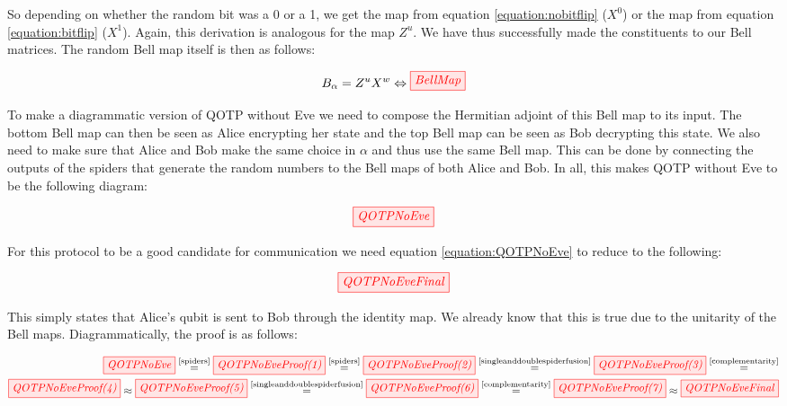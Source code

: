 \documentclass[]{article}
\newcommand{\equaltext}[1]{\ensuremath{\stackrel{\text{#1}}{=}}}
\begin{document}
So depending on whether the random bit was a 0 or a 1, we get the map from equation \ref{equation:nobitflip} ($X^0$) or the map from equation \ref{equation:bitflip} ($X^1$). Again, this derivation is analogous for the map $Z^u$. We have thus successfully made the constituents to our Bell matrices. The random Bell map itself is then as follows:

\begin{equation}
	\label{equation:BellMap}
	B_\alpha = Z^uX^w \Leftrightarrow \tikzfig{BellMap}
\end{equation}

To make a diagrammatic version of QOTP without Eve we need to compose the Hermitian adjoint of this Bell map to its input. The bottom Bell map can then be seen as Alice encrypting her state and the top Bell map can be seen as Bob decrypting this state. We also need to make sure that Alice and Bob make the same choice in $\alpha$ and thus use the same Bell map. This can be done by connecting the outputs of the spiders that generate the random numbers to the Bell maps of both Alice and Bob. In all, this makes QOTP without Eve to be the following diagram:

\begin{equation}
	\tikzfig{QOTPNoEve}
	\label{equation:QOTPNoEve}
\end{equation}

For this protocol to be a good candidate for communication we need equation \ref{equation:QOTPNoEve} to reduce to the following: 

\begin{equation}
	\tikzfig{QOTPNoEveFinal}
\end{equation}

This simply states that Alice's qubit is sent to Bob through the identity map. We already know that this is true due to the unitarity of the Bell maps. Diagrammatically, the proof is as follows:

\begin{equation}
	\begin{split}
	\tikzfig{QOTPNoEve} \equaltext{\ref{spiders}} 
	\tikzfig{QOTPNoEveProof(1)} \equaltext{\ref{spiders}}
	\tikzfig{QOTPNoEveProof(2)} \equaltext{\ref{singleanddoublespiderfusion}}
	\tikzfig{QOTPNoEveProof(3)} \equaltext{\ref{complementarity}} \\
	\tikzfig{QOTPNoEveProof(4)} \approx
	\tikzfig{QOTPNoEveProof(5)} \equaltext{\ref{singleanddoublespiderfusion}}
	\tikzfig{QOTPNoEveProof(6)} \equaltext{\ref{complementarity}}
	\tikzfig{QOTPNoEveProof(7)} \approx
	\tikzfig{QOTPNoEveFinal}
	\end{split}
\end{equation}
\end{document}
